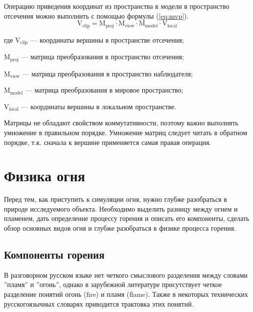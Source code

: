 Операцию приведения координат из пространства в модели в пространство отсечения
можно выполнить с помощью формулы (\ref{eq:mvp}).
\begin{equation}
  \label{eq:mvp}
  \text{V}_\text{clip} = \text{M}_\text{proj} \cdot \text{M}_\text{view} \cdot
  \text{M}_\text{model} \cdot \text{V}_\text{local}
\end{equation}
\begin{explanationx}
    \item [где] $\text{V}_\text{clip}$ --- координаты вершины в пространстве
        отсечения;
    \item $\text{M}_\text{proj}$ --- матрица преобразования в пространство
        отсечения;
    \item $\text{M}_\text{view}$ --- матрица преобразования в пространство
        наблюдателя;
    \item $\text{M}_\text{model}$ --- матрица преобразования в мировое
        пространство;
    \item $\text{V}_\text{local}$ --- координаты вершины в локальном
        пространстве.
\end{explanationx}

Матрицы не обладают свойством коммутативности, поэтому важно выполнять умножение
в правильном порядке. Умножение матриц следует читать в обратном порядке,
т\@.к\@. сначала к вершине применяется самая правая операция.

\section{Физика огня}

Перед тем, как приступить к симуляции огня, нужно глубже разобраться в природе
исследуемого объекта. Необходимо выделить разницу между огнем и пламенем,
дать определение процессу горения и описать его компоненты, сделать обзор
основных видов огня и глубже разобраться в физике процесса горения.

\subsection{Компоненты горения}

В разговорном русском языке нет четкого смыслового разделения между словами
''пламя'' и ''огонь''\cite{WikiFlame}, однако в зарубежной литературе
присутствует четкое разделение понятий огонь (fire) и пламя (flame). Также в
некоторых технических русскогоязычных словарях приводится трактовка этих
понятий.

